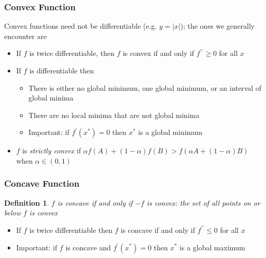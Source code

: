\documentclass{beamer}
\newtheorem{defn}{Definition}
\numberwithin{equation}{section}
\begin{document}
\begin{frame}
\frametitle{Convex Function}

Convex functions need not be differentiable (e.g. $y=|x|$); the ones we generally encounter are \pause

\begin{itemize}
\item If $f$ is twice differentiable, then $f$ is convex if and only if $f^{\prime\prime}\geq 0$ for all $x$ \pause

\item If $f$ is differentiable then
\begin{itemize}
\item There is either no global minimum, one global minimum, or an interval of global minima \pause
\item There are no local minima that are not global minima \pause
\item Important: if $f^\prime(x^*)=0$ then $x^*$ is a global minimum \pause
\end{itemize}
\item $f$ is \textit{strictly convex} if $\alpha f(A)+(1-\alpha)f(B)> f(\alpha A+(1-\alpha)B)$ when $\alpha\in(0, 1)$
\end{itemize}

\end{frame}



\begin{frame}
\frametitle{Concave Function}

\begin{defn}
$f$ is \textit{concave} if and only if $-f$ is convex: the set of all points on or below $f$ is convex
\end{defn} \pause

\begin{itemize}
\item If $f$ is twice differentiable then $f$ is concave if and only if $f^{\prime\prime}\leq 0$ for all $x$ \pause

\item Important: if $f$ is concave and $f^\prime(x^*)=0$ then $x^*$ is a global maximum

\end{itemize}

\end{frame}
\end{document}
